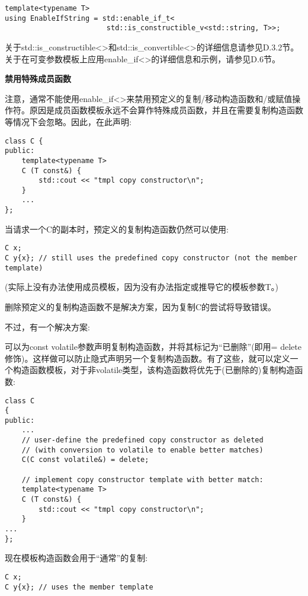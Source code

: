 \begin{lstlisting}[style=styleCXX]
template<typename T>
using EnableIfString = std::enable_if_t<
						std::is_constructible_v<std::string, T>>;
\end{lstlisting}

关于std::is\_constructible<>和std::is\_convertible<>的详细信息请参见D.3.2节。关于在可变参数模板上应用enable\_if<>的详细信息和示例，请参见D.6节。

\noindent
\textbf{禁用特殊成员函数}

注意，通常不能使用enable\_if<>来禁用预定义的复制/移动构造函数和/或赋值操作符。原因是成员函数模板永远不会算作特殊成员函数，并且在需要复制构造函数等情况下会忽略。因此，在此声明:

\begin{lstlisting}[style=styleCXX]
class C {
public:
	template<typename T>
	C (T const&) {
		std::cout << "tmpl copy constructor\n";
	}
	...
};
\end{lstlisting}

当请求一个C的副本时，预定义的复制构造函数仍然可以使用:

\begin{lstlisting}[style=styleCXX]
C x;
C y{x}; // still uses the predefined copy constructor (not the member template)
\end{lstlisting}

(实际上没有办法使用成员模板，因为没有办法指定或推导它的模板参数T。)

删除预定义的复制构造函数不是解决方案，因为复制C的尝试将导致错误。

不过，有一个解决方案:

可以为const volatile参数声明复制构造函数，并将其标记为“已删除”(即用= delete修饰)。这样做可以防止隐式声明另一个复制构造函数。有了这些，就可以定义一个构造函数模板，对于非volatile类型，该构造函数将优先于(已删除的)复制构造函数:

\begin{lstlisting}[style=styleCXX]
class C
{
public:
	...
	// user-define the predefined copy constructor as deleted
	// (with conversion to volatile to enable better matches)
	C(C const volatile&) = delete;
	
	// implement copy constructor template with better match:
	template<typename T>
	C (T const&) {
		std::cout << "tmpl copy constructor\n";
	}
...
};
\end{lstlisting}

现在模板构造函数会用于“通常”的复制:

\begin{lstlisting}[style=styleCXX]
C x;
C y{x}; // uses the member template
\end{lstlisting}

